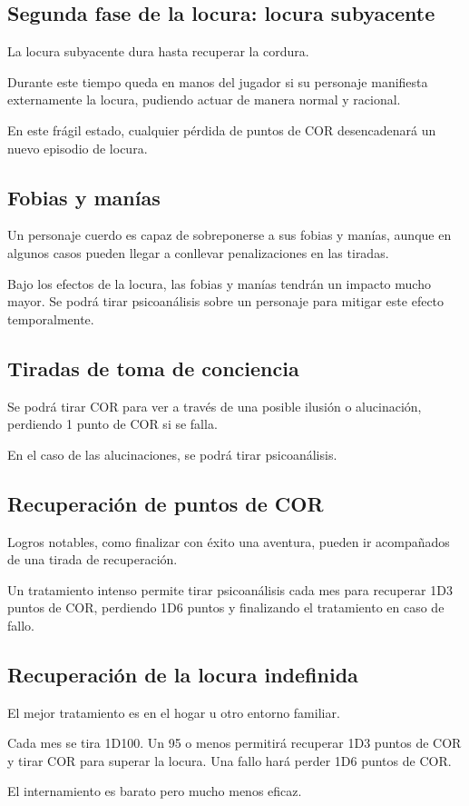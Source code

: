 \subsection{Segunda fase de la locura: locura subyacente}

La locura subyacente dura hasta recuperar la cordura.

Durante este tiempo queda en manos del jugador si su personaje manifiesta externamente la locura, pudiendo actuar de manera normal y racional.

En este frágil estado, cualquier pérdida de puntos de COR desencadenará un nuevo episodio de locura.

\subsection{Fobias y manías}

Un personaje cuerdo es capaz de sobreponerse a sus fobias y manías, aunque en algunos casos pueden llegar a conllevar penalizaciones en las tiradas.

Bajo los efectos de la locura, las fobias y manías tendrán un impacto mucho mayor. Se podrá tirar psicoanálisis sobre un personaje para mitigar este efecto temporalmente.

\subsection{Tiradas de toma de conciencia}

Se podrá tirar COR para ver a través de una posible ilusión o alucinación, perdiendo 1 punto de COR si se falla.

En el caso de las alucinaciones, se podrá tirar psicoanálisis.

\subsection{Recuperación de puntos de COR}

Logros notables, como finalizar con éxito una aventura, pueden ir acompañados de una tirada de recuperación.

Un tratamiento intenso permite tirar psicoanálisis cada mes para recuperar 1D3 puntos de COR, perdiendo 1D6 puntos y finalizando el tratamiento en caso de fallo.

\subsection{Recuperación de la locura indefinida}

El mejor tratamiento es en el hogar u otro entorno familiar.

Cada mes se tira 1D100. Un 95 o menos permitirá recuperar 1D3 puntos de COR y tirar COR para superar la locura. Una fallo hará perder 1D6 puntos de COR.

El internamiento es barato pero mucho menos eficaz.